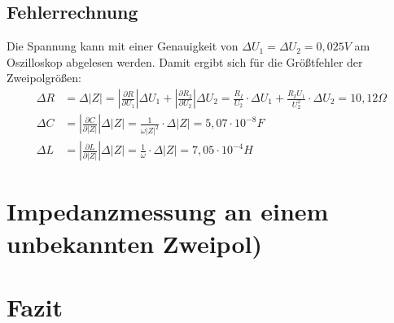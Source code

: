\documentclass{scrartcl}
\begin{document}
\subsection{Fehlerrechnung}
Die Spannung kann mit einer Genauigkeit von $\Delta U_{1} = \Delta U_{2} = 0,025V$ am Oszilloskop abgelesen werden. Damit ergibt sich für die Größtfehler der Zweipolgrößen:
\begin{align*}
\Delta R &= \Delta |Z| = \left| \frac{\partial R}{\partial U_{1}} \right| \Delta U_{1} + \left| \frac{\partial R_{2}}{\partial U_{2}} \right| \Delta U_{2} = \frac{R_{I}}{U_{2}} \cdot \Delta U_{1} + \frac{R_{I}U_{1}}{U_{2}^2} \cdot \Delta U_{2} = 10,12 \Omega \\
\Delta C &= \left| \frac{\partial C}{\partial |Z|} \right| \Delta |Z| = \frac{1}{\omega |Z|^2} \cdot \Delta |Z| = 5,07 \cdot 10^{-8} F\\
\Delta L &= \left| \frac{\partial L}{\partial |Z|} \right| \Delta |Z| = \frac{1}{\omega} \cdot \Delta |Z| = 7,05 \cdot 10^{-4} H
\end{align*}
\section{Impedanzmessung an einem unbekannten Zweipol)}

\section{Fazit}
\end{document}
